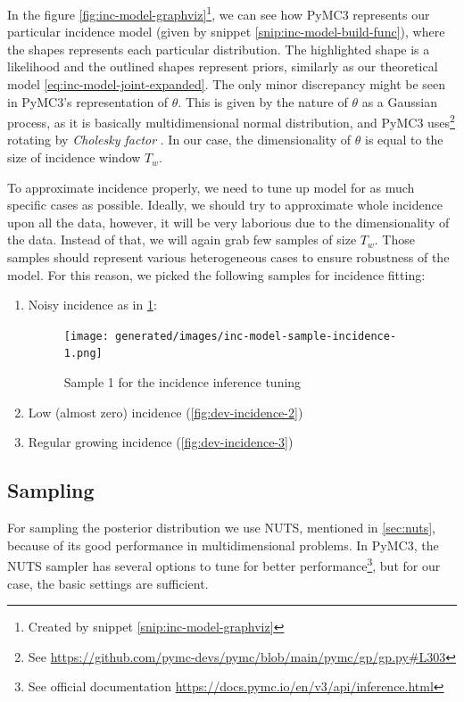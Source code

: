 \documentclass[
  digital, %
  oneside, %
  lof,     %
  lot,     %
]{fithesis4}
\begin{document}
In the figure \ref{fig:inc-model-graphviz}\footnote{Created by snippet \ref{snip:inc-model-graphviz}},
we can see how PyMC3 represents our particular incidence model (given by snippet \ref{snip:inc-model-build-func}),
where the shapes represents each particular distribution.
The highlighted shape is a likelihood and the outlined 
shapes represent priors, similarly as our theoretical 
model \ref{eq:inc-model-joint-expanded}.
The only minor discrepancy might be seen in PyMC3's representation of $\theta$.
This is given by the nature of $\theta$ as a Gaussian process, as it is 
basically multidimensional normal distribution,
and PyMC3 uses\footnote{See \url{https://github.com/pymc-devs/pymc/blob/main/pymc/gp/gp.py\#L303}} rotating by \textit{Cholesky 
factor} \cite[Chapter 7]{murphy2021}.
In our case, the dimensionality of $\theta$ is equal to 
the size of incidence window $T_w$.

To approximate incidence properly, we need to tune up model for
as much specific cases as possible. Ideally, we should try to approximate
whole incidence upon all the data, however, it will be very laborious 
due to the dimensionality of the data.
Instead of that, we will again grab few samples of size $T_w$. 
Those samples should represent various heterogeneous cases to ensure 
robustness of the model.
For this reason, we picked the following samples for incidence fitting:

\begin{enumerate}
  \item Noisy incidence as in \ref{fig:dev-incidence-1}:
  \begin{figure}[H]
    \begin{center}
      \texttt{[image: generated/images/inc-model-sample-incidence-1.png]}
    \end{center}
    \caption{Sample 1 for the incidence inference tuning}
    \label{fig:dev-incidence-1}
  \end{figure}
  \item Low (almost zero) incidence (\ref{fig:dev-incidence-2})
  \item Regular growing incidence (\ref{fig:dev-incidence-3})
\end{enumerate}


\subsection{Sampling}

For sampling the posterior distribution we use NUTS, mentioned
in \autoref{sec:nuts}, because of its good performance 
in multidimensional problems.
In PyMC3, the NUTS sampler has several options
to tune for better performance\footnote{See official documentation \url{https://docs.pymc.io/en/v3/api/inference.html}}, but for our case, the
basic settings are sufficient.
\end{document}
